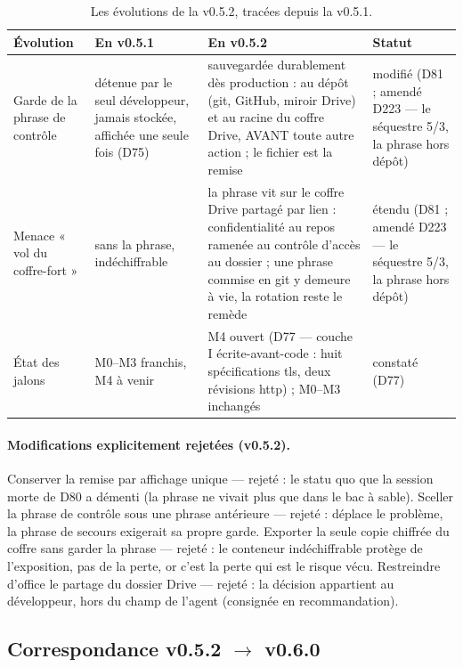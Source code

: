 \begin{table}[htbp]
\centering\small
\caption{Les évolutions de la v0.5.2, tracées depuis la v0.5.1.}
\label{tab:correspondance052}
\begin{tabularx}{\textwidth}{@{}l Y Y l@{}}
\toprule
\textbf{Évolution} & \textbf{En v0.5.1} & \textbf{En v0.5.2} & \textbf{Statut} \\
\midrule
Garde de la phrase de contrôle & détenue par le seul développeur, jamais stockée,
affichée une seule fois (D75) & sauvegardée durablement dès production :
 au dépôt (git, GitHub, miroir Drive) et au racine du
coffre Drive, AVANT toute autre action ; le fichier est la remise & modifié
(D81 ; amendé D223 — le séquestre 5/3, la phrase hors dépôt) \\
Menace « vol du coffre-fort » & sans la phrase, indéchiffrable & la phrase vit sur le
coffre Drive partagé par lien : confidentialité au repos ramenée au contrôle d'accès au
dossier ; une phrase commise en git y demeure à vie, la rotation reste le remède &
étendu (D81 ; amendé D223 — le séquestre 5/3, la phrase hors dépôt) \\
État des jalons & M0–M3 franchis, M4 à venir & M4 ouvert (D77 — couche I
écrite-avant-code : huit spécifications tls, deux révisions http) ; M0–M3 inchangés &
constaté (D77) \\
\bottomrule
\end{tabularx}
\end{table}

\paragraph{Modifications explicitement rejetées (v0.5.2).} Conserver la remise par
affichage unique — rejeté : le statu quo que la session morte de D80 a démenti (la
phrase ne vivait plus que dans le bac à sable). Sceller la phrase de contrôle sous une
phrase antérieure — rejeté : déplace le problème, la phrase de secours exigerait sa
propre garde. Exporter la seule copie chiffrée du coffre sans garder la phrase — rejeté :
le conteneur indéchiffrable protège de l'exposition, pas de la perte, or c'est la perte
qui est le risque vécu. Restreindre d'office le partage du dossier Drive — rejeté : la
décision appartient au développeur, hors du champ de l'agent (consignée en
recommandation).

\subsection{Correspondance v0.5.2 $\to$ v0.6.0}\label{sec:evolutions060}

